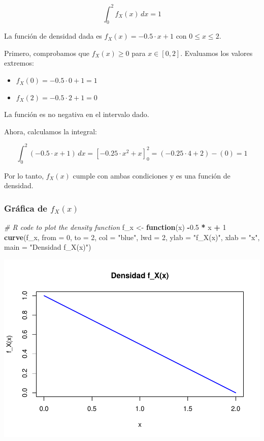 \documentclass[
]{article}
\newenvironment{Shaded}{\begin{snugshade}}{\end{snugshade}}
\newcommand{\AttributeTok}[1]{\textcolor[rgb]{0.13,0.29,0.53}{#1}}
\newcommand{\CommentTok}[1]{\textcolor[rgb]{0.56,0.35,0.01}{\textit{#1}}}
\newcommand{\ControlFlowTok}[1]{\textcolor[rgb]{0.13,0.29,0.53}{\textbf{#1}}}
\newcommand{\DecValTok}[1]{\textcolor[rgb]{0.00,0.00,0.81}{#1}}
\newcommand{\FloatTok}[1]{\textcolor[rgb]{0.00,0.00,0.81}{#1}}
\newcommand{\FunctionTok}[1]{\textcolor[rgb]{0.13,0.29,0.53}{\textbf{#1}}}
\newcommand{\NormalTok}[1]{#1}
\newcommand{\OtherTok}[1]{\textcolor[rgb]{0.56,0.35,0.01}{#1}}
\newcommand{\SpecialCharTok}[1]{\textcolor[rgb]{0.81,0.36,0.00}{\textbf{#1}}}
\newcommand{\StringTok}[1]{\textcolor[rgb]{0.31,0.60,0.02}{#1}}
\providecommand{\tightlist}{%
  \setlength{\itemsep}{0pt}\setlength{\parskip}{0pt}}
\begin{document}
\[
\int_0^2 f_X(x) \, dx = 1
\]

La función de densidad dada es \(f_X(x) = -0.5 \cdot x + 1\) con \(0 \leq x \leq 2\).

Primero, comprobamos que \(f_X(x) \geq 0\) para \(x \in [0, 2]\). Evaluamos los valores extremos:

\begin{itemize}
\tightlist
\item
  \(f_X(0) = -0.5 \cdot 0 + 1 = 1\)
\item
  \(f_X(2) = -0.5 \cdot 2 + 1 = 0\)
\end{itemize}

La función es no negativa en el intervalo dado.

Ahora, calculamos la integral:

\[
\int_0^2 (-0.5 \cdot x + 1) \, dx = \left[ -0.25 \cdot x^2 + x \right]_0^2 = (-0.25 \cdot 4 + 2) - (0) = 1
\]

Por lo tanto, \(f_X(x)\) cumple con ambas condiciones y es una función de densidad.

\subsubsection{\texorpdfstring{Gráfica de \(f_X(x)\)}{Gráfica de f\_X(x)}}\label{gruxe1fica-de-f_xx}

\begin{Shaded}
\begin{Highlighting}[]
\CommentTok{\# R code to plot the density function}
\NormalTok{f\_x }\OtherTok{\textless{}{-}} \ControlFlowTok{function}\NormalTok{(x) }\SpecialCharTok{{-}}\FloatTok{0.5} \SpecialCharTok{*}\NormalTok{ x }\SpecialCharTok{+} \DecValTok{1}
\FunctionTok{curve}\NormalTok{(f\_x, }\AttributeTok{from =} \DecValTok{0}\NormalTok{, }\AttributeTok{to =} \DecValTok{2}\NormalTok{, }\AttributeTok{col =} \StringTok{"blue"}\NormalTok{, }\AttributeTok{lwd =} \DecValTok{2}\NormalTok{, }\AttributeTok{ylab =} \StringTok{"f\_X(x)"}\NormalTok{, }\AttributeTok{xlab =} \StringTok{"x"}\NormalTok{,}
      \AttributeTok{main =} \StringTok{"Densidad f\_X(x)"}\NormalTok{)}
\end{Highlighting}
\end{Shaded}

\includegraphics{EjerciciosInferenciaEstadistica_files/figure-latex/unnamed-chunk-14-1.pdf}
\end{document}
